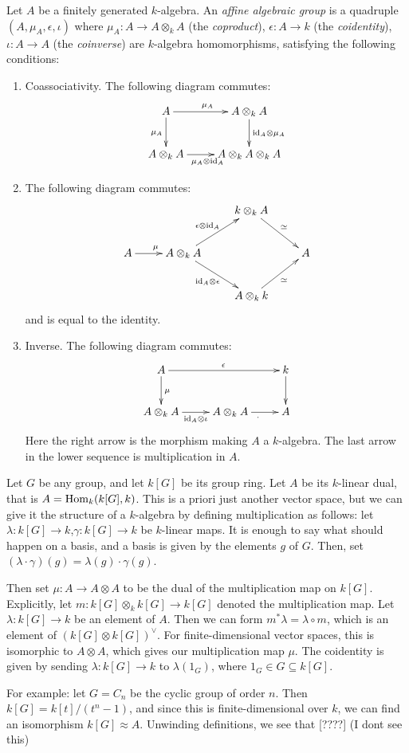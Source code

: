 \documentclass[11pt, norsk]{article}
\begin{document}
\begin{defi}
Let $A$ be a finitely generated $k$-algebra. An \emph{affine algebraic group} is a quadruple $(A,\mu_A,\epsilon,\iota)$ where $\mu_A:A \to A \otimes_k A$ (the \emph{coproduct}), $\epsilon:A \to k$ (the \emph{coidentity}), $\iota: A \to A$ (the \emph{coinverse}) are $k$-algebra homomorphisms, satisfying the following conditions:
\begin{enumerate}
\item Coassociativity. The following diagram commutes:
\[
\xymatrix{
A \ar[r]^{\mu_A} \ar[d]_{\mu_A} & A \otimes_k A \ar[d]^{\id_A \otimes \mu_A} \\
A \otimes_k A \ar[r]_{\mu_A \otimes \id_A} & A \otimes_k A \otimes_k A
}
\]
\item The following diagram commutes:
\[
\xymatrix{
 & & k \otimes_k A  \ar[dr]^{\simeq} \\
A \ar[r]^\mu & A \otimes_k A \ar[ur]^{\epsilon \otimes \id_A} \ar[dr]_{\id_A \otimes \epsilon}  & & A \\
 & & A \otimes_k k \ar[ur]_{\simeq}
 }
\]
and is equal to the identity.
\item Inverse. The following diagram commutes:
\[
\xymatrix{
A \ar[d]^\mu \ar[rr]^\epsilon & & k \ar[d] \\
A \otimes_k A \ar[r]_{\id_A \otimes \iota} & A \otimes_k A \ar[r]_\cdot & A
}
\]
Here the right arrow is the morphism making $A$ a $k$-algebra. The last arrow in the lower sequence is multiplication in $A$.
\end{enumerate}
\end{defi}

\begin{example}
 Let $G$ be any group, and let $k[G]$ be its group ring. Let $A$ be its $k$-linear dual, that is $A=\operatorname{Hom}_k(k[G],k)$. This is a priori just another vector space, but we can give it the structure of a $k$-algebra by defining multiplication as follows: let $\lambda:k[G] \to k$,$\gamma:k[G] \to k$ be $k$-linear maps. It is enough to say what should happen on a basis, and a basis is given by the elements $g$ of $G$. Then, set $(\lambda \cdot \gamma)(g) = \lambda(g)\cdot \gamma(g)$.

Then set $\mu:A \to A \otimes A$ to be the dual of the multiplication map on $k[G]$. Explicitly, let $m:k[G] \otimes_k k[G] \to k[G]$ denoted the multiplication map. Let $\lambda:k[G] \to k$ be an element of $A$. Then we can form $m^\ast \lambda = \lambda \circ m$, which is an element of $(k[G] \otimes k[G])^\vee$. For finite-dimensional vector spaces, this is isomorphic to $A \otimes A$, which gives our multiplication map $\mu$. The coidentity is given by sending $\lambda:k[G]\to k$ to $\lambda(1_G)$, where $1_G \in G \subseteq k[G]$.

For example: let $G=C_n$ be the cyclic group of order $n$. Then $k[G] = k[t]/(t^n-1)$, and since this is finite-dimensional over $k$, we can find an isomorphism $k[G] \approx A$. Unwinding definitions, we see that [????] (I dont see this)
\end{example}
\end{document}
